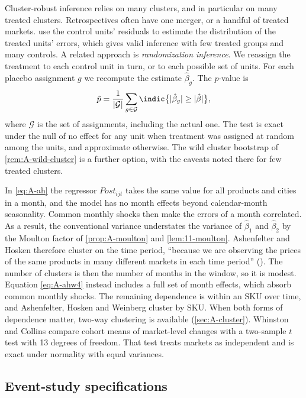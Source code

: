 Cluster-robust inference relies on many clusters, and in particular on many treated clusters. Retrospectives often
have one merger, or a handful of treated markets. \citet{ConleyTaber2011} use the control units' residuals to
estimate the distribution of the treated units' errors, which gives valid inference with few treated groups and
many controls. A related approach is \emph{randomization inference}. We reassign the treatment to each control unit
in turn, or to each possible set of units. For each placebo assignment $g$ we recompute the estimate $\hat\beta_g$.
The $p$-value is
\begin{equation*}
\hat p=\frac{1}{|\mathcal{G}|}\sum_{g\in\mathcal{G}}\indic\big\{|\hat\beta_g|\ge|\hat\beta|\big\},
\end{equation*}
where $\mathcal{G}$ is the set of assignments, including the actual one. The test is exact under the null of no
effect for any unit when treatment was assigned at random among the units, and approximate otherwise. The wild
cluster bootstrap of \cref{rem:A-wild-cluster} is a further option, with the caveats noted there for few treated clusters.

In \eqref{eq:A-ah} the regressor $\mathit{Post}_{ijt}$ takes the same value for all products and cities in a month,
and the model has no month effects beyond calendar-month seasonality. Common monthly shocks then make the errors of a
month correlated. As a result, the conventional variance understates the variance of $\hat\beta_1$ and $\hat\beta_2$
by the Moulton factor \citep{Moulton1987,Moulton1990} of \cref{prop:A-moulton} and \cref{lem:11-moulton}. Ashenfelter and Hosken therefore cluster on the time
period, ``because we are observing the prices of the same products in many different markets in each time period''
(\citealp[p.~25]{AshenfelterHosken2008}). The number of clusters is then the number of months in the window, so it is
modest. Equation \eqref{eq:A-ahw4} instead includes a full set of month effects, which absorb common monthly shocks.
The remaining dependence is within an SKU over time, and Ashenfelter, Hosken and Weinberg cluster by SKU. When both
forms of dependence matter, two-way clustering is available (\cref{sec:A-cluster}). Whinston and Collins compare cohort
means of market-level changes with a two-sample $t$ test with 13 degrees of freedom. That test treats markets as
independent and is exact under normality with equal variances.

\subsection{Event-study specifications}\label{sec:A-did-es}

